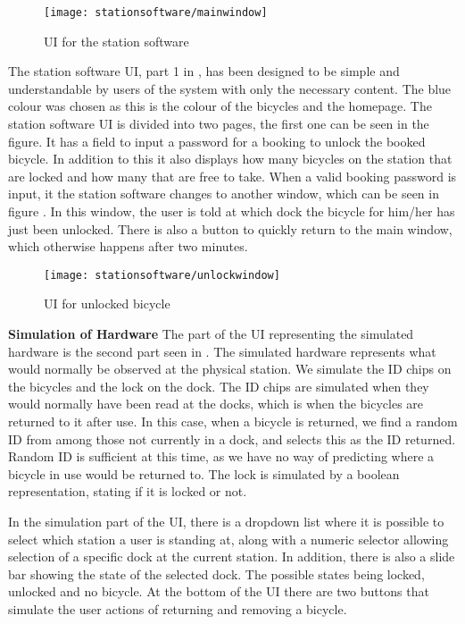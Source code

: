 \begin{figure}
	\centering
	\texttt{[image: stationsoftware/mainwindow]}
	\caption{UI for the station software}\label{fig:stationMain}
\end{figure}

The station software UI, part 1 in , has been designed to be simple and understandable by users of the system with only the necessary content.
The blue colour was chosen as this is the colour of the bicycles and the \bycykel homepage.
The station software UI is divided into two pages, the first one can be seen in the figure.
It has a field to input a password for a booking to unlock the booked bicycle.
In addition to this it also displays how many bicycles on the station that are locked and how many that are free to take.
When a valid booking password is input, it the station software changes to another window, which can be seen in figure .
In this window, the user is told at which dock the bicycle for him/her has just been unlocked.
There is also a button to quickly return to the main window, which otherwise happens after two minutes.

\begin{figure}
	\centering
	\texttt{[image: stationsoftware/unlockwindow]}
	\caption{UI for unlocked bicycle}\label{fig:bicycleUnlock}
\end{figure}

\textbf{Simulation of Hardware}
The part of the UI representing the simulated hardware is the second part seen in .
The simulated hardware represents what would normally be observed at the physical station.
We simulate the ID chips on the bicycles and the lock on the dock.
The ID chips are simulated when they would normally have been read at the docks, which is when the bicycles are returned to it after use.
In this case, when a bicycle is returned, we find a random ID from among those not currently in a dock, and selects this as the ID returned.
Random ID is sufficient at this time, as we have no way of predicting where a bicycle in use would be returned to.
The lock is simulated by a boolean representation, stating if it is locked or not.

In the simulation part of the UI, there is a dropdown list where it is possible to select which station a user is standing at, along with a numeric selector allowing selection of a specific dock at the current station.
In addition, there is also a slide bar showing the state of the selected dock.
The possible states being locked, unlocked and no bicycle.
At the bottom of the UI there are two buttons that simulate the user actions of returning and removing a bicycle.

